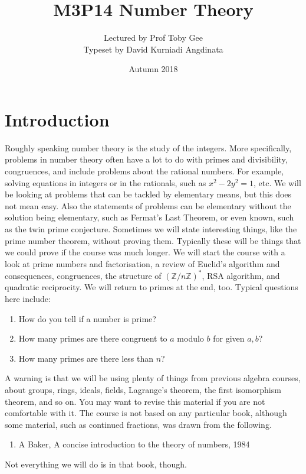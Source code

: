 \documentclass{article}
\title{M3P14 Number Theory}
\author{Lectured by Prof Toby Gee \\ Typeset by David Kurniadi Angdinata}
\date{Autumn 2018}
\newcommand{\Z}{\mathbb{Z}}
\newcommand{\rb}[1]{\left( #1 \right)}
\theoremstyle{definition}\newtheorem{definition}{Definition}
\theoremstyle{definition}\newtheorem*{remark}{Remark}
\theoremstyle{definition}\newtheorem*{example}{Example}
\theoremstyle{definition}\newtheorem*{note}{Note}
\begin{document}
\maketitle

\vfill

\tableofcontents

\pagebreak


\section{Introduction}

Roughly speaking number theory is the study of the integers. More specifically, problems in number theory often have a lot to do with primes and divisibility, congruences, and include problems about the rational numbers. For example, solving equations in integers or in the rationals, such as $ x^2 - 2y^2 = 1 $, etc. We will be looking at problems that can be tackled by elementary means, but this does not mean easy. Also the statements of problems can be elementary without the solution being elementary, such as Fermat's Last Theorem, or even known, such as the twin prime conjecture. Sometimes we will state interesting things, like the prime number theorem, without proving them. Typically these will be things that we could prove if the course was much longer. We will start the course with a look at prime numbers and factorisation, a review of Euclid's algorithm and consequences, congruences, the structure of $ \rb{\Z / n\Z}^* $, RSA algorithm, and quadratic reciprocity. We will return to primes at the end, too. Typical questions here include:
\begin{enumerate}
\item How do you tell if a number is prime?
\item How many primes are there congruent to $ a $ modulo $ b $ for given $ a, b $?
\item How many primes are there less than $ n $?
\end{enumerate}
A warning is that we will be using plenty of things from previous algebra courses, about groups, rings, ideals, fields, Lagrange's theorem, the first isomorphism theorem, and so on. You may want to revise this material if you are not comfortable with it. The course is not based on any particular book, although some material, such as continued fractions, was drawn from the following.
\begin{enumerate}
\item A Baker, A concise introduction to the theory of numbers, 1984
\end{enumerate}
Not everything we will do is in that book, though.
\end{document}
